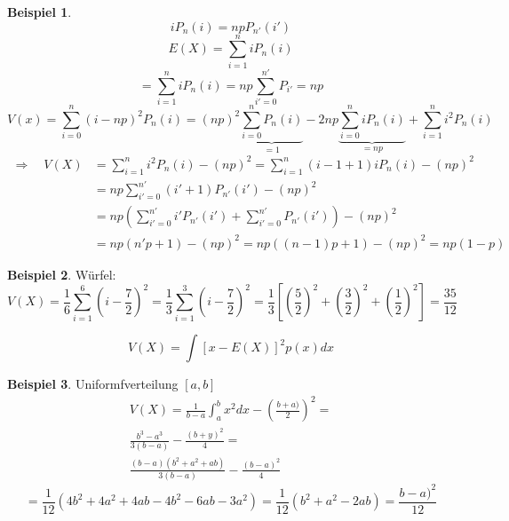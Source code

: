 \documentclass[a4paper]{article}
\theoremstyle{definition}
\newtheorem{beispiel}{Beispiel}%
\theoremstyle{remark}
\begin{document}
\begin{beispiel}
 \begin{equation}
   iP_n(i)=npP_{n'}(i')
 \end{equation}
 \begin{equation}
   E(X)=\sum_{i=1}^{n}iP_n(i)
 \end{equation}
\begin{equation}
  = \sum_{i=1}^{n}iP_n(i)=np\sum_{i'=0}^{n'}	P_{i'}=np
\end{equation}
\begin{equation}
  V(x)=\sum_{i=0}^{n}(i-np)^2P_n(i)=(np)^2\underbrace{\sum_{i=0}^{n}P_n(i)}_{=1} -2np\underbrace{\sum_{i=0}^{n}iP_n(i)}_{=np} + \sum_{i=1}^{n}i^2P_n(i)
\end{equation}
\begin{equation}
  \begin{split}
  \Rightarrow \quad V(X)&=\sum_{i=1}^{n}i^2P_n(i)-(np)^2 = \sum_{i=1}^{n}(i-1+1)iP_n(i)-(np)^2\\
  &= np\sum_{i'=0}^{n'}(i'+1)P_{n'}(i') -(np)^2 \\
  &= np\left( \sum_{i'=0}^{n'}i'P_{n'}(i')+\sum_{i'=0}^{n'}P_{n'}(i') \right)-(np)^2\\
  &= np(n'p +1) -(np)^2= np\left( (n-1)p+1\right)-(np)^2=np(1-p)
  \end{split}
\end{equation}
\end{beispiel}
 \begin{beispiel}
   Würfel: 
   \begin{equation}
     V(X)= \frac{1}{6}\sum_{i=1}^{6}(i-\frac{7}{2})^2= \frac{1}{3}\sum_{i=1}^{3}(i-\frac{7}{2})^2=\frac{1}{3}\left[ (\frac{5}{2})^2 + \left( \frac{3}{2} \right)^2+\left( \frac{1}{2} \right)^2 \right]=\frac{35}{12}
   \end{equation}

 \end{beispiel} 
\begin{equation}
  V(X)=\int\left[ x-E(X) \right]^2p(x)dx
\end{equation}  
  \begin{beispiel}
    Uniformfverteilung $[a,b]$\\
    \begin{multline}
V(X)= \frac{1}{b-a}\int_{a}^{b}x^2dx-\left( \frac{b+a)}{2} \right)^2 =\\
\frac{b^3-a^3}{3(b-a)}-\frac{(b+y)^2}{4}=\\
\frac{(b-a)(b^2+a^2+ab)}{3(b-a)}-\frac{(b-a)^2}{4}
    \end{multline}
  \begin{equation}
  = \frac{1}{12}(4b^2+4a^2+4ab-4b^2-6ab-3a^2)= \frac{1}{12}(b^2+a^2-2ab)=\frac{b-a)^2}{12}
  \end{equation}
  \end{beispiel}
\end{document}
